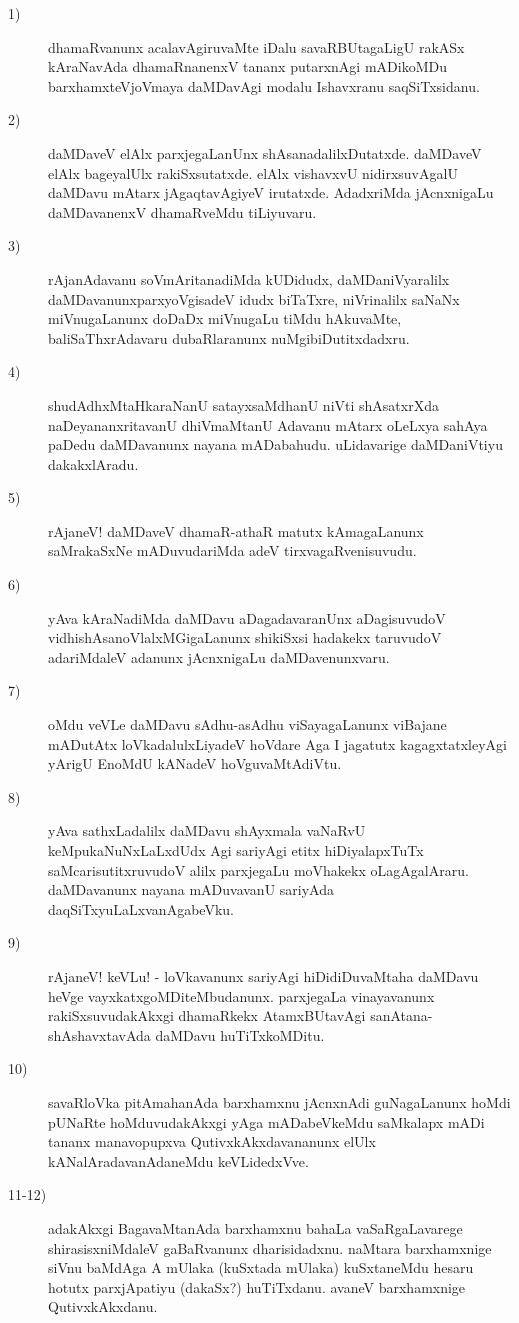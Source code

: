 \begin{description}
\item [1)] dhamaRvanunx acalavAgiruvaMte iDalu savaRBUtagaLigU rakASx kAraNa\-vAda dhamaRnanenxV tananx putarx\-nAgi mADikoMDu barxhamxteVjoVmaya daMDavAgi modalu Ishavxranu saqSiTxsidanu.
\item [2)] daMDaveV elAlx parxjegaLanUnx shAsanadalilxDutatxde. daMDaveV elAlx bageyalUlx rakiSxsutatxde. elAlx vishavxvU nidirxsuvAgalU daMDavu mAtarx jAgaqtavAgiyeV irutatxde. AdadxriMda jAcnxnigaLu daMDa\-vanenxV dhamaRveMdu tiLiyuvaru.
\item [3)] rAjanAdavanu soVmAritanadiMda kUDidudx, daMDaniVyaralilx daMDavanunx\break parxyoVgisadeV idudx biTaTxre, niVrinalilx saNaNx miVnugaLanunx doDaDx miVnu\-gaLu tiMdu hAkuvaMte, baliSaThxrAdavaru du\-baR\-laranunx nuMgibiDutitxdadxru.
\item [4)] shudAdhxMtaHkaraNanU satayxsaMdhanU niVti shAsatxrXda naDeyananxritavanU dhiVmaM\-tanU Adavanu mAtarx oLeLxya sahAya paDedu daMDavanunx nayana mADa\-bahudu. uLidavarige daMDaniVtiyu dakakx\-lAradu. 
\item [5)] rAjaneV! daMDaveV dhamaR-athaR matutx kAmagaLanunx saMrakaSxNe mADuvudariMda adeV tirxvagaR\-venisuvudu.
\item [6)] yAva kAraNadiMda daMDavu aDagadavaranUnx aDagisuvudoV vidhishAsanoV\-lalxMGigaLanunx shikiSxsi hadakekx taruvudoV adariMdaleV adanunx jAcnxnigaLu daMDavenunxvaru.
\item [7)] oMdu veVLe daMDavu sAdhu-asAdhu viSayagaLanunx viBajane mADutAtx loVkadalulxLiyadeV hoVdare Aga I jagatutx kagagxtatxleyAgi yArigU EnoMdU kANadeV hoVguvaMtAdiVtu.
\item [8)] yAva sathxLadalilx daMDavu shAyxmala vaNaRvU keMpukaNuNxLaLxdUdx Agi sariyAgi etitx hiDiyalapxTuTx saMcarisutitxruvudoV alilx parxjegaLu moVhakekx oLagAga\-lAraru. daMDavanunx nayana mADuva\-vanU sariyAda daqSiTxyuLaLxva\-nAgabeVku.
\item [9)] rAjaneV! keVLu! - loVkavanunx sariyAgi hiDidiDuvaMtaha daMDavu heVge vayxkatxgoMDiteMbu\-danunx. parxjegaLa vinayavanunx rakiSxsuvudakAkxgi dhamaRkekx AtamxBUtavAgi sanAtana-shAshavxtavAda daM\-Davu huTiTxkoMDitu.
\item [10)] savaRloVka pitAmahanAda barxhamxnu jAcnxnAdi guNagaLanunx hoMdi pUNaRte hoMduvudakAkxgi yAga mADabeVkeMdu saMkalapx mADi tananx manavopupxva QutivxkAkxdavananunx elUlx kANalAradava\-nAdaneMdu keVLidedxVve.
\item [11-12)] adakAkxgi BagavaMtanAda barxhamxnu bahaLa vaSaRgaLavarege shirasisxniMdaleV gaBaRvanunx dharisi\-dadxnu. naMtara barxhamxnige siVnu baMdAga A mUlaka (kuSxtada mUlaka) kuSxtaneMdu hesaru hotutx parxjA\-patiyu (dakaSx?) huTiTxdanu. avaneV barxhamxnige QutivxkAkxdanu.


\end{description}
